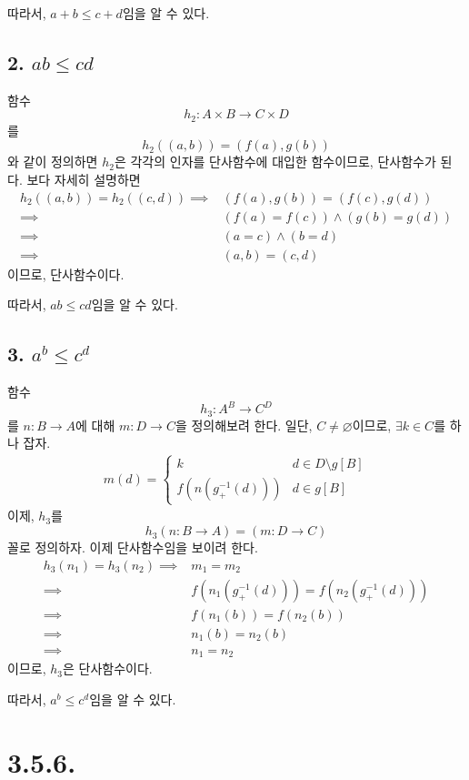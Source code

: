 \documentclass{article}
\begin{document}
따라서, $a+b \le c+d$임을 알 수 있다.

\subsection{2. $ab \le cd$}
함수
$$h_2 : A \times B \rightarrow C \times D$$
를
$$
h_2( (a, b) ) = \left(f(a), g(b) \right)
$$
와 같이 정의하면 $h_2$은 각각의 인자를 단사함수에 대입한 함수이므로, 단사함수가 된다. 보다 자세히 설명하면
\begin{align*}
h_2((a, b)) = h_2((c, d)) \implies & \left(f(a), g(b)\right) = \left(f(c), g(d)\right)
\\ \implies & \left(f(a) = f(c)\right) \wedge \left(g(b) = g(d)\right)
\\ \implies & \left(a=c\right) \wedge \left(b=d\right)
\\ \implies & (a, b) = (c, d)
\end{align*}이므로, 단사함수이다.

따라서, $ab \le cd$임을 알 수 있다.

\subsection{3. $a^b \le c^d$}
함수
$$h_3 : A^B \rightarrow C^D$$
를
$n : B \rightarrow A$에 대해 $m : D \rightarrow C$을 정의해보려 한다. 일단, $C \neq \varnothing$이므로, $\exists k \in C$를 하나 잡자.
\begin{align*}
m(d) = \left\{ \begin{matrix}
k & d \in D \setminus g[B]
\\ f(n(g_+^{-1}(d))) & d \in g[B]
\end{matrix} \right.
\end{align*}
이제, $h_3$를
$$
h_3( n : B \rightarrow A ) = ( m : D \rightarrow C)
$$
꼴로 정의하자. 이제 단사함수임을 보이려 한다.
\begin{align*}
h_3(n_1) = h_3(n_2) \implies & m_1 = m_2
\\ \implies & f(n_1(g_+^{-1}(d))) = f(n_2(g_+^{-1}(d))) \tag{$d \in g[B]$}
\\ \implies & f(n_1(b)) = f(n_2(b)) \tag{$b \in B$}
\\ \implies & n_1(b) = n_2(b) \tag{$f$는 단사함수}
\\ \implies & n_1 = n_2
\end{align*}이므로, $h_3$은 단사함수이다.

따라서, $a^b \le c^d$임을 알 수 있다.


\section{3.5.6.}
\end{document}
